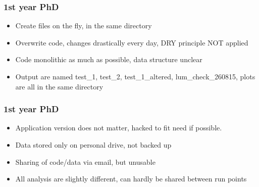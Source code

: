 \documentclass[14pt]{beamer}
\begin{document}
\begin{frame}
\frametitle{1st year PhD}
\begin{itemize}
\item Create files on the fly, in the same directory
\item Overwrite code, changes drastically every day, DRY principle NOT applied
\item Code monolithic as much as possible, data structure unclear
\item Output are named test\_1, test\_2, test\_1\_altered, lum\_check\_260815, plots are all in the same directory
\end{itemize}
\end{frame}

\begin{frame}
\frametitle{1st year PhD}
\begin{itemize}
\item Application version does not matter, hacked to fit need if possible.
\item Data stored only on personal drive, not backed up
\item Sharing of code/data via email, but unusable
\item All analysis are slightly different, can hardly be shared between run points
\end{itemize}
\end{frame}
\end{document}

